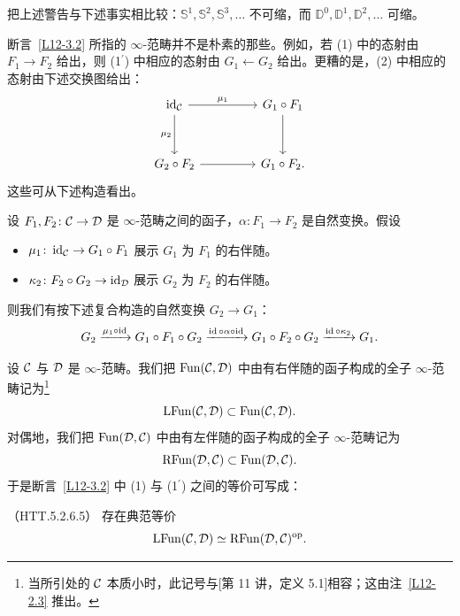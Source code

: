 \begin{exercise}\label{L12-3.5}
把上述警告与下述事实相比较：$\mathbb{S}^{1},\mathbb{S}^{2},\mathbb{S}^{3},\dots$ 不可缩，而 $\mathbb{D}^{0},\mathbb{D}^{1},\mathbb{D}^{2},\dots$ 可缩。
\end{exercise}

\begin{warning}\label{L12-3.6}
断言~\ref{L12-3.2} 所指的 $\infty$-范畴并不是朴素的那些。例如，若 (1) 中的态射由 $F_1\to F_2$ 给出，则 (1$^{\prime}$) 中相应的态射由 $G_1\leftarrow G_2$ 给出。更糟的是，(2) 中相应的态射由下述交换图给出：
\[
\begin{tikzcd}[column sep=4.5em,row sep=3.2em]
\id_{\cC} \arrow[r,"\mu_1"] \arrow[d,"\mu_2"'] & G_1\circ F_1 \arrow[d] \\
G_2\circ F_2 \arrow[r] & G_1\circ F_2.
\end{tikzcd}
\]
这些可从下述构造看出。
\end{warning}

\begin{construction}\label{L12-3.7}
设 $F_1,F_2\colon\mathcal{C}\to\mathcal{D}$ 是 $\infty$-范畴之间的函子，$\alpha\colon F_1\to F_2$ 是自然变换。假设
\begin{itemize}[leftmargin=2.2em,itemsep=0.1em]
\item $\mu_1\colon\operatorname{id}_{\mathcal{C}}\to G_1\circ F_1$ 展示 $G_1$ 为 $F_1$ 的右伴随。
\item $\kappa_2\colon F_2\circ G_2\to\operatorname{id}_{\mathcal{D}}$ 展示 $G_2$ 为 $F_2$ 的右伴随。
\end{itemize}
则我们有按下述复合构造的自然变换 $G_2\to G_1$：
\[
G_2\xrightarrow{\mu_1\circ\operatorname{id}}G_1\circ F_1\circ G_2\xrightarrow{\operatorname{id}\circ\alpha\circ\operatorname{id}}G_1\circ F_2\circ G_2\xrightarrow{\operatorname{id}\circ\kappa_2}G_1.
\]
\end{construction}

\nitem\label{L12-3.8} 设 $\mathcal{C}$ 与 $\mathcal{D}$ 是 $\infty$-范畴。我们把 $\operatorname{Fun}(\mathcal{C},\mathcal{D})$ 中由有右伴随的函子构成的全子 $\infty$-范畴记为\footnote{当所引处的 $\mathcal{C}$ 本质小时，此记号与[第 11 讲，定义 5.1]相容；这由注~\ref{L12-2.3} 推出。}
\[
\mathrm{LFun}(\mathcal{C},\mathcal{D})\subset\operatorname{Fun}(\mathcal{C},\mathcal{D}).
\]
对偶地，我们把 $\operatorname{Fun}(\mathcal{D},\mathcal{C})$ 中由有左伴随的函子构成的全子 $\infty$-范畴记为
\[
\mathrm{RFun}(\mathcal{D},\mathcal{C})\subset\operatorname{Fun}(\mathcal{D},\mathcal{C}).
\]
于是断言~\ref{L12-3.2} 中 (1) 与 (1$^{\prime}$) 之间的等价可写成：

\begin{proposition}\label{L12-3.9}（HTT.5.2.6.5）
存在典范等价
\[
\mathrm{LFun}(\mathcal{C},\mathcal{D})\simeq\mathrm{RFun}(\mathcal{D},\mathcal{C})^{\mathrm{op}}.
\]
\end{proposition}

